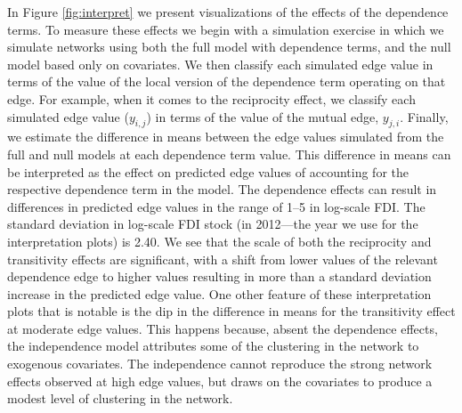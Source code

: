 \documentclass[reqno,onecolumn,letterpaper,12pt]{article}
\begin{document}
In Figure \ref{fig:interpret} we present visualizations of the effects of the dependence terms. To measure these effects we begin with a simulation exercise in which we simulate networks using both the full model with dependence terms, and the null model based only on covariates. We then classify each simulated edge value in terms of the value of the local version of the dependence term operating on that edge. For example, when it comes to the reciprocity effect, we classify each simulated edge value ($y_{i,j}$) in terms of the value of the mutual edge, $y_{j,i}$. Finally, we estimate the difference in means between the edge values simulated from the full and null models at each dependence term value. This difference in means can be interpreted as the effect on predicted edge values of accounting for the respective dependence term in the model. The dependence effects can result in differences in predicted edge values in the range of 1--5 in log-scale FDI. The standard deviation in log-scale FDI stock (in 2012---the year we use for the interpretation plots) is 2.40.  We see that the scale of both the reciprocity and transitivity effects are significant, with a shift from lower values of the relevant dependence edge to higher values resulting in more than a standard deviation increase in the predicted edge value. One other feature of these interpretation plots that is notable is the dip in the difference in means for the transitivity effect at moderate edge values. This happens because, absent the dependence effects, the independence model attributes some of the clustering in the network to exogenous covariates. The independence cannot reproduce the strong network effects observed at high edge values, but draws on the covariates to produce a modest level of clustering in the network.
\end{document}
